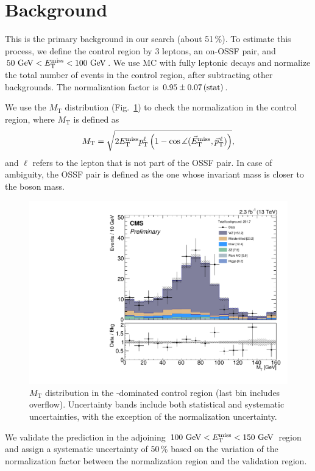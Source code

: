 \section{\texorpdfstring{\WZ}{WZ} Background}
\label{sec:bkg_WZ}

This is the primary background in our search (about 51\,\%). To estimate this process, we define the \WZ control region by 3 leptons, an on-\Z OSSF pair, and $50\,\,\text{Ge\hspace{-.08em}V} < E_{\mathrm{T}}^{\text{miss}} < 100\,\,\text{Ge\hspace{-.08em}V}$. We use \WZ MC with fully leptonic decays and normalize the total number of events in the control region, after subtracting other backgrounds. The normalization factor is $0.95 \pm 0.07\,\text{(stat)}$.

We use the $M_\textrm{T}$ distribution (Fig.~\ref{fig:WZ}) to check the \WZ normalization in the control region, where $M_\textrm{T}$ is defined as
$$M_\textrm{T} = \sqrt{2 E_{\mathrm{T}}^{\text{miss}} p_\textrm{T}^\ell \left( 1 - \cos\measuredangle(\vec E_\textrm{T}^\text{miss}, \vec p_\textrm{T}^{\,\ell}) \right)},$$ and $\ell$ refers to the lepton that is not part of the OSSF pair. In case of ambiguity, the OSSF pair is defined as the one whose invariant mass is closer to the \Z boson mass.

\begin{figure}
\begin{center}
	\includegraphics[width=.7\textwidth]{Background/bkg_WZ/WZ_MET50to100_MT}
	\caption{$M_\textrm{T}$ distribution in the \WZ-dominated control region (last bin includes overflow). Uncertainty bands include both statistical and systematic uncertainties, with the exception of the \WZ normalization uncertainty.
	\label{fig:WZ}}
\end{center}
\end{figure}

We validate the prediction in the adjoining $100\,\,\text{Ge\hspace{-.08em}V} < E_{\mathrm{T}}^{\text{miss}} < 150\,\,\text{Ge\hspace{-.08em}V}$ region and assign a systematic uncertainty of 50\,\% based on the variation of the normalization factor between the normalization region and the validation region.
